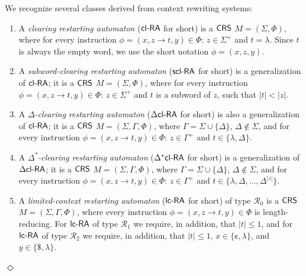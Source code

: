 \begin{definition}\label{definition:derived-classes}
We recognize several classes derived from context rewriting systems:
\begin{enumerate}
\item\label{definition:clra} A \emph{clearing restarting automaton} \cite{CM10} (\emph{$\mbox{\sf cl-RA\/}$} for short) is a $\mbox{\sf CRS\/}$ $M = (\Sigma, \Phi)$, where for every instruction $\phi = (x, z \to t, y) \in \Phi$: $z \in \Sigma^+$ and $t = \lambda$. Since $t$ is always the empty word, we use the short notation $\phi = (x, z, y)$.

\item\label{definition:sclra}
A \emph{subword-clearing restarting automaton} \cite{C12} (\emph{$\mbox{\sf scl-RA}$} for short) is a generalization of $\mbox{\sf cl-RA\/}$; it is a $\mbox{\sf CRS\/}$ $M = (\Sigma, \Phi)$, where for every instruction $\phi = (x, z \to t, y) \in \Phi$: $z \in \Sigma^+$ and $t$ is a subword of $z$, such that $|t| < |z|$.

\item\label{definition:dclra} A \emph{$\Delta$-clearing restarting automaton} \cite{CM10} (\emph{$\mbox{\sf $\Delta$cl-RA\/}$} for short) is also a generalization of $\mbox{\sf cl-RA\/}$; it is a $\mbox{\sf CRS\/}$ $M = (\Sigma, \Gamma, \Phi)$, where $\Gamma = \Sigma \cup \{\Delta\}$, $\Delta \notin \Sigma$, and for every instruction $\phi = (x, z \to t, y) \in \Phi$: $z \in \Gamma^+$ and $t \in \{\lambda, \Delta\}$.

\item\label{definition:dxclra} A \emph{$\Delta^*$-clearing restarting automaton} \cite{CM10} (\emph{$\mbox{\sf $\Delta^*$cl-RA\/}$} for short) is a generalization of $\mbox{\sf $\Delta$cl-RA\/}$; it is a $\mbox{\sf CRS\/}$ $M = (\Sigma, \Gamma, \Phi)$, where $\Gamma = \Sigma \cup \{\Delta\}$, $\Delta \notin \Sigma$, and for every instruction $\phi = (x, z \to t, y) \in \Phi$: $z \in \Gamma^+$ and $t \in \{\lambda, \Delta, \ldots, \Delta^{|z|}\}$.

\item \label{definition:lcra} A \emph{limited-context restarting automaton} \cite{B10Diploma, B11, OCM13} (\emph{$\lcRA$} for short) of type $\mathcal{R}_0$ is a $\mbox{\sf CRS\/}$ $M = (\Sigma, \Gamma, \Phi)$, where every instruction $\phi = (x, z \to t, y) \in \Phi$ is length-reducing. For $\lcRA$ of type $\mathcal{R}_1$ we require, in addition, that $|t| \le 1$, and for $\lcRA$ of type $\mathcal{R}_2$ we require, in addition, that $|t| \le 1$, $x \in \{\cent, \lambda\}$, and $y \in \{\$, \lambda\}$.
\end{enumerate}
\hfill$\Diamond$
\end{definition}

